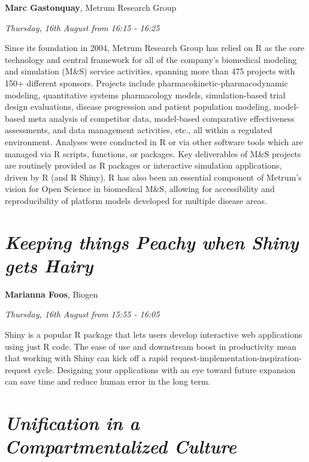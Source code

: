 \documentclass[]{book}
\theoremstyle{definition}
\theoremstyle{definition}
\theoremstyle{definition}
\theoremstyle{remark}
\begin{document}
\textbf{Marc Gastonquay}, Metrum Research Group

\emph{Thursday, 16th August from 16:15 - 16:25}

Since its foundation in 2004, Metrum Research Group has relied on R as
the core technology and central framework for all of the company's
biomedical modeling and simulation (M\&S) service activities, spanning
more than 475 projects with 150+ different sponsors. Projects include
pharmacokinetic-pharmacodynamic modeling, quantitative systems
pharmacology models, simulation-based trial design evaluations, disease
progression and patient population modeling, model-based meta analysis
of competitor data, model-based comparative effectiveness assessments,
and data management activities, etc., all within a regulated
environment. Analyses were conducted in R or via other software tools
which are managed via R scripts, functions, or packages. Key
deliverables of M\&S projects are routinely provided as R packages or
interactive simulation applications, driven by R (and R Shiny). R has
also been an essential component of Metrum's vision for Open Science in
biomedical M\&S, allowing for accessibility and reproducibility of
platform models developed for multiple disease areas.

\hypertarget{keeping-things-peachy-when-shiny-gets-hairy}{%
\section{\texorpdfstring{\emph{Keeping things Peachy when Shiny gets
Hairy}}{Keeping things Peachy when Shiny gets Hairy}}\label{keeping-things-peachy-when-shiny-gets-hairy}}

\textbf{Marianna Foos}, Biogen

\emph{Thursday, 16th August from 15:55 - 16:05}

Shiny is a popular R package that lets users develop interactive web
applications using just R code. The ease of use and downstream boost in
productivity mean that working with Shiny can kick off a rapid
request-implementation-inspiration-request cycle. Designing your
applications with an eye toward future expansion can save time and
reduce human error in the long term.

\hypertarget{unification-in-a-compartmentalized-culture}{%
\section{\texorpdfstring{\emph{Unification in a Compartmentalized
Culture}}{Unification in a Compartmentalized Culture}}\label{unification-in-a-compartmentalized-culture}}
\end{document}

